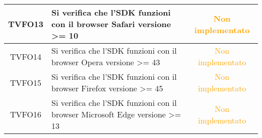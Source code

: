 \begin{center}
\begin{longtable}{|c|>{\centering}m{10cm}|c|}
		TVFO13 & Si verifica che l'SDK funzioni con il browser Safari versione >= 10 & \textcolor{Orange}{Non implementato}\\ \hline
		TVFO14 & Si verifica che l'SDK funzioni con il browser Opera versione >= 43 & \textcolor{Orange}{Non implementato}\\ \hline
		TVFO15 & Si verifica che l'SDK funzioni con il browser Firefox versione >= 45 & \textcolor{Orange}{Non implementato}\\ \hline
		TVFO16 & Si verifica che l'SDK funzioni con il browser Microsoft Edge versione >= 13 & \textcolor{Orange}{Non implementato}\\ \hline
	\end{longtable}
\end{center}
